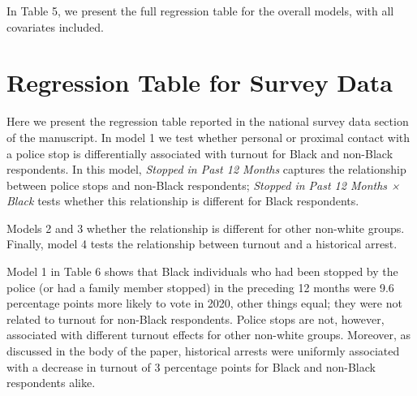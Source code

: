 \documentclass[
  12pt,
]{article}
\begin{document}
In Table 5, we present the full regression table for the overall models, with all covariates included.

\begin{singlespace}

\end{singlespace}

\begin{singlespace}

\end{singlespace}

\begin{singlespace}

\end{singlespace}

\begin{singlespace}

\end{singlespace}

\hypertarget{regression-table-for-survey-data}{%
\section{Regression Table for Survey Data}\label{regression-table-for-survey-data}}

Here we present the regression table reported in the national survey data section of the manuscript. In model 1 we test whether personal or proximal contact with a police stop is differentially associated with turnout for Black and non-Black respondents. In this model, \emph{Stopped in Past 12 Months} captures the relationship between police stops and non-Black respondents; \emph{Stopped in Past 12 Months × Black} tests whether this relationship is different for Black respondents.

Models 2 and 3 whether the relationship is different for other non-white groups. Finally, model 4 tests the relationship between turnout and a historical arrest.

\begin{singlespace}

\end{singlespace}

Model 1 in Table 6 shows that Black individuals who had been stopped by the police (or had a family member stopped) in the preceding 12 months were 9.6 percentage points more likely to vote in 2020, other things equal; they were not related to turnout for non-Black respondents. Police stops are not, however, associated with different turnout effects for other non-white groups. Moreover, as discussed in the body of the paper, historical arrests were uniformly associated with a decrease in turnout of 3 percentage points for Black and non-Black respondents alike.
\end{document}
